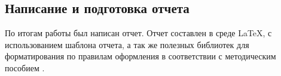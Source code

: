 \subsection{Написание и подготовка отчета}

По итогам работы был написан отчет. Отчет составлен в среде \LaTeX, с использованием шаблона отчета, а так же 
полезных библиотек для форматирования по правилам оформления в соответствии с методическим пособием \cite{markina}.

